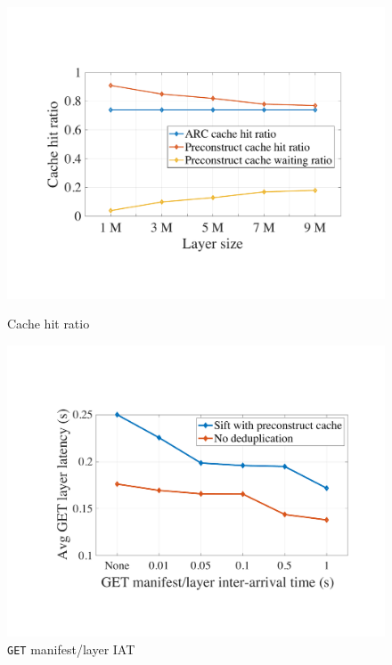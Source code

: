\begin{figure}[t]
\begin{minipage}{0.28\textwidth}
		\includegraphics[width=\textwidth]{graphs/cachehitratio.pdf}
		\caption{Cache hit ratio}%
		\label{fig:eval-cachehitratios}
	\end{minipage}%
\hfill
	\begin{minipage}{0.28\textwidth}
	\centering
	\includegraphics[width=\textwidth]{graphs/durationML.pdf}
	\caption{\texttt{GET} manifest/layer IAT}
	\label{fig:eval-durationML}
   \end{minipage}
\end{figure}

